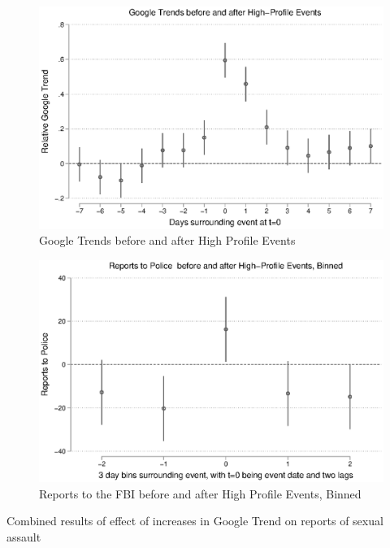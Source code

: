 \documentclass[AER,draftmode]{AEA}
\begin{document}
\begin{figure}
\includegraphics[width=\linewidth]{figures/events_trend.eps}
\caption{Google Trends before and after High Profile Events} \label{figure:events_trend}
\end{figure}

\begin{figure}
\includegraphics[width=\linewidth]{figures/events_police_binned.eps}
\caption{Reports to the FBI before and after High Profile Events, Binned} \label{figure:events_police_binned}
\end{figure}

\clearpage

\begin{table}[]
\caption{Combined results of effect of increases in Google Trend on reports of sexual assault} \label{table:combinedtable}

\end{table}
\end{document}
